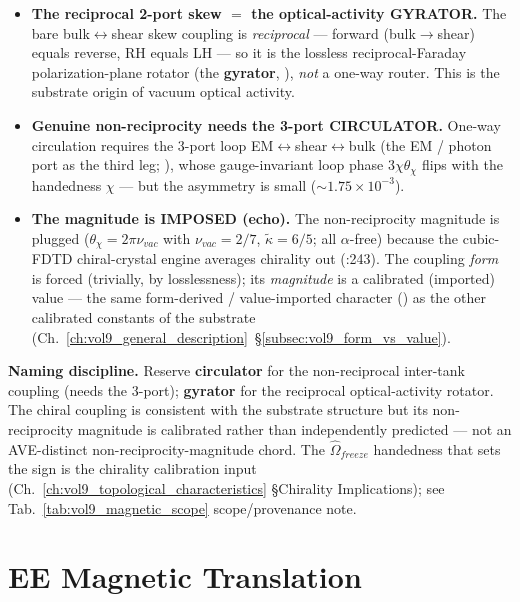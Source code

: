 \begin{itemize}
    \item \textbf{The reciprocal 2-port skew $=$ the optical-activity GYRATOR.} The bare bulk$\leftrightarrow$shear skew coupling is \emph{reciprocal} --- forward (bulk$\to$shear) equals reverse, RH equals LH --- so it is the lossless reciprocal-Faraday polarization-plane rotator (the \textbf{gyrator}, ), \emph{not} a one-way router. This is the substrate origin of vacuum optical activity.
    \item \textbf{Genuine non-reciprocity needs the 3-port CIRCULATOR.} One-way circulation requires the 3-port loop EM$\leftrightarrow$shear$\leftrightarrow$bulk (the EM / photon port as the third leg; ), whose gauge-invariant loop phase $3\chi\theta_\chi$ flips with the handedness $\chi$ --- but the asymmetry is small ($\sim 1.75\times10^{-3}$).
    \item \textbf{The magnitude is IMPOSED (echo).} The non-reciprocity magnitude is plugged ($\theta_\chi = 2\pi\nu_{vac}$ with $\nu_{vac} = 2/7$, $\tilde\kappa = 6/5$; all $\alpha$-free) because the cubic-FDTD chiral-crystal engine averages chirality out (:243). The coupling \emph{form} is forced (trivially, by losslessness); its \emph{magnitude} is a calibrated (imported) value --- the same form-derived / value-imported character () as the other calibrated constants of the substrate (Ch.~\ref{ch:vol9_general_description}~\S\ref{subsec:vol9_form_vs_value}).
\end{itemize}

\noindent
\textbf{Naming discipline.} Reserve \textbf{circulator} for the non-reciprocal inter-tank coupling (needs the 3-port); \textbf{gyrator} for the reciprocal optical-activity rotator. The chiral coupling is consistent with the substrate structure but its non-reciprocity magnitude is calibrated rather than independently predicted --- not an AVE-distinct non-reciprocity-magnitude chord. The $\hat{\Omega}_{freeze}$ handedness that sets the sign is the chirality calibration input (Ch.~\ref{ch:vol9_topological_characteristics} \S Chirality Implications); see Tab.~\ref{tab:vol9_magnetic_scope} scope/provenance note.

\section{EE Magnetic Translation}
\label{sec:vol9_magnetic_ee_translation}

